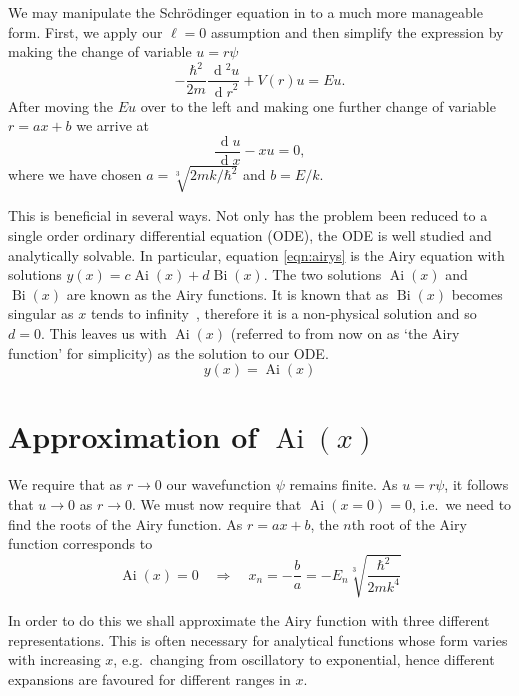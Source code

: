 \documentclass[]{article}
\renewcommand{\d}[1]{\ensuremath{\,\operatorname{d}\!{#1}}}
\newcommand{\Ai}[1]{\ensuremath{\operatorname{Ai}({#1})}}
\newcommand{\Bi}[1]{\ensuremath{\operatorname{Bi}({#1})}}
\begin{document}
We may manipulate the Schr\"{o}dinger equation in to a much more manageable form. First, we apply our $\ell = 0$ assumption and then simplify the expression by making the change of variable $u = r\psi$
\[
-\frac{\hbar^{2}}{2m}
 \frac{\d{^{2}u}}{\d{r}^{2}}
+ V(r)u = Eu.
\]
After moving the $Eu$ over to the left and making one further change of variable $r = ax + b$ we  arrive at
\begin{equation}\label{eqn:airys}
\frac{\d{u}}{\d{x}} - xu = 0,
\end{equation}
where we have chosen $a = \sqrt[3]{2mk/\hbar^{2}}$ and $b = E/k$.

This is beneficial in several ways. Not only has the problem been reduced to a single order ordinary differential equation (ODE), the ODE is well studied and analytically solvable. In particular, equation \ref{eqn:airys} is the Airy equation with solutions $y(x) = c\Ai{x} + d\Bi{x}$. The two solutions $\Ai{x}$ and $\Bi{x}$ are known as the Airy functions. It is known that as $\Bi{x}$ becomes singular as $x$ tends to infinity~\cite{ref:abramowitz}, therefore it is a non-physical solution and so $d = 0$. This leaves us with $\Ai{x}$ (referred to from now on as `the Airy function' for simplicity) as the solution to our ODE.\footnotemark
\[
y(x) = \Ai{x}
\]

\footnotetext{$\Ai{x} \to 0$ as $x \to \pm\infty$.}



\section{Approximation of \Ai{x}}\label{sec:approximation}

We require that as $r \to 0$ our wavefunction $\psi$ remains finite. As $u = r\psi$, it follows that $u \to 0$ as $r \to 0$. We must now require that $\Ai{x = 0} = 0$, i.e.\ we need to find the roots of the Airy function. As $r = ax + b$, the $n$th root of the Airy function corresponds to
\begin{equation}\label{eqn:rootexpression}
\Ai{x} = 0 \quad\Rightarrow\quad x_{n} = -\frac{b}{a} = -E_{n}\sqrt[3]{\frac{\hbar^{2}}{2mk^{4}}}
\end{equation}

In order to do this we shall approximate the Airy function with three different representations. This is often necessary for analytical functions whose form varies with increasing $x$, e.g.\ changing from oscillatory to exponential, hence different expansions are favoured for different ranges in $x$.
\end{document}
